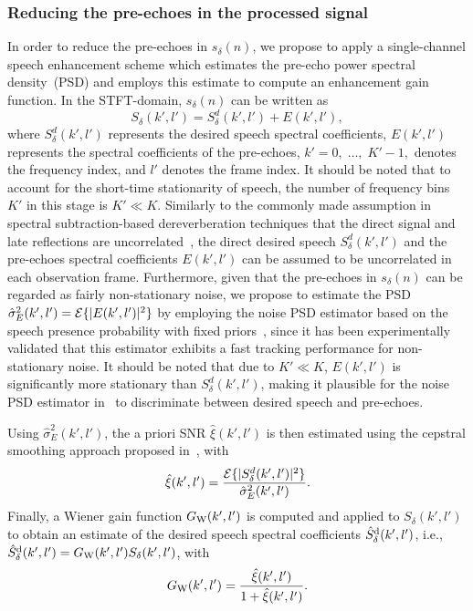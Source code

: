 \documentclass{article}
\begin{document}
\subsubsection{Reducing the pre-echoes in the processed signal}
\label{sec: enh}
In order to reduce the pre-echoes in $s_{\delta}(n)$, we propose to apply a single-channel speech enhancement scheme which estimates the pre-echo power spectral density~(PSD) and employs this estimate to compute an enhancement gain function.
In the STFT-domain, $s_{\delta}(n)$ can be written as  
\begin{equation}
S_{\delta}(k',l') = S_{\delta}^d(k',l') + E(k',l'), 
\end{equation}
where $S_{\delta}^d(k',l')$ represents the desired speech spectral coefficients, $E(k',l')$ represents the spectral coefficients of the pre-echoes, $k' = 0, \; \ldots, \; K'-1,$ denotes the frequency index, and $l'$ denotes the frame index.
It should be noted that to account for the short-time stationarity of speech, the number of frequency bins $K'$ in this stage is $K' \ll K$.
Similarly to the commonly made assumption in spectral subtraction-based dereverberation techniques that the direct signal and late reflections are uncorrelated~\cite{Kinoshita_ITASLP_2009}, the direct desired speech $S_{\delta}^d(k',l')$ and the pre-echoes spectral coefficients $E(k',l')$ can be assumed to be uncorrelated in each observation frame.
Furthermore, given that the pre-echoes in $s_{\delta}(n)$ can be regarded as fairly non-stationary noise, we propose to estimate the PSD $\hat{\sigma}_E^2(k',l') = {\cal{E}} \{ |E(k',l')|^2 \}$ by employing the noise PSD estimator based on the speech presence probability with fixed priors~\cite{Gerkmann_2012}, since it has been experimentally validated that this estimator exhibits a fast tracking performance for non-stationary noise.
It should be noted that due to $K' \ll K$, $E(k',l')$ is significantly more stationary than $S_{\delta}^d(k',l')$, making it plausible for the noise PSD estimator in~\cite{Gerkmann_2012} to discriminate between desired speech and pre-echoes.

Using $\hat{\sigma}_E^2(k',l')$, the a priori SNR $\hat{\xi}(k',l')$ is then estimated using the cepstral smoothing approach proposed in~\cite{Breithaupt_2008}, with
\begin{equation}
\hat{\xi}(k',l') = \frac{{\cal{E}} \{ |S_{\delta}^d(k',l') |^2 \} }{\hat{\sigma}_{E}^2(k',l')}.
\end{equation}
Finally, a Wiener gain function $G_{\rm W}(k',l')$ is computed and applied to $S_{\delta}(k',l')$ to obtain an estimate of the desired speech spectral coefficients $\hat{S}_{\delta}^{\rm d}(k',l')$, i.e., $\hat{S}_{\delta}^{\rm d}(k',l') = G_{\rm W}(k',l')S_{\delta}(k',l')$, with
\begin{equation}
  G_{\rm W}(k',l') = \frac{\hat{\xi}(k',l')}{1+\hat{\xi}(k',l')}.
\end{equation}
\end{document}
